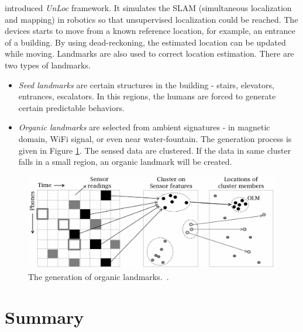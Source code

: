 \documentclass[letterpaper]{article}
\begin{document}
\cite{Wang:2012:NNW:2307636.2307655} introduced \emph{UnLoc} framework.
It simulates the SLAM (simultaneous localization and mapping) in robotics so that unsupervised localization could be reached.
The devices starts to move from a known reference location, for example, an entrance of a building.
By using dead-reckoning, the estimated location can be updated while moving.
Landmarks are also used to correct location estimation.
There are two types of landmarks.
\begin{itemize}
	\item \emph{Seed landmarks} are certain structures in the building - stairs, elevators, entrances, escalators.
	In this regions, the humans are forced to generate certain predictable behaviors.
	\item \emph{Organic landmarks} are selected from ambient signatures - in magnetic domain, WiFi signal, or even near water-fountain.
	The generation process is given in Figure \ref{fig:olm}.
	The sensed data are clustered.
	If the data in same cluster falls in a small region, an organic landmark will be created.
\end{itemize}
\begin{figure}
	\centering
	\includegraphics[width=0.9\linewidth]{fig/OLM.png}
	\caption{The generation of organic landmarks.~\cite{Wang:2012:NNW:2307636.2307655}.}
	\label{fig:olm}
\end{figure}


\section{Summary}



\end{document}
